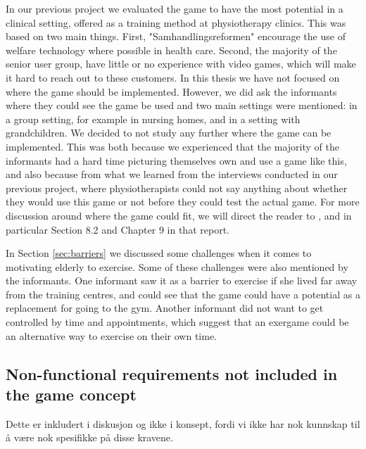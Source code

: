 In our previous project \cite{project} we evaluated the game to have the most potential in a clinical setting, offered as a training method at physiotherapy clinics. This was based on two main things. First, "Samhandlingsreformen" encourage the use of welfare technology where possible in health care. Second, the majority of the senior user group, have little or no experience with video games, which will make it hard to reach out to these customers. In this thesis we have not focused on where the game should be implemented. However, we did ask the informants where they could see the game be used and two main settings were mentioned: in a group setting, for example in nursing homes, and in a setting with grandchildren. We decided to not study any further where the game can be implemented. This was both because we experienced that the majority of the informants had a hard time picturing themselves own and use a game like this, and also because from what we learned from the interviews conducted in our previous project, where physiotherapists could not say anything about whether they would use this game or not before they could test the actual game. For more discussion around where the game could fit, we will direct the reader to \cite{project}, and in particular Section 8.2 and Chapter 9 in that report. 

In Section \ref{sec:barriers} we discussed some challenges when it comes to motivating elderly to exercise. Some of these challenges were also mentioned by the informants. One informant saw it as a barrier to exercise if she lived far away from the training centres, and could see that the game could have a potential as a replacement for going to the gym. Another informant did not want to get controlled by time and appointments, which suggest that an exergame could be an alternative way to exercise on their own time. 

\subsection{Non-functional requirements not included in the game concept}

Dette er inkludert i diskusjon og ikke i konsept, fordi vi ikke har nok kunnskap til å være nok spesifikke på disse kravene. 

